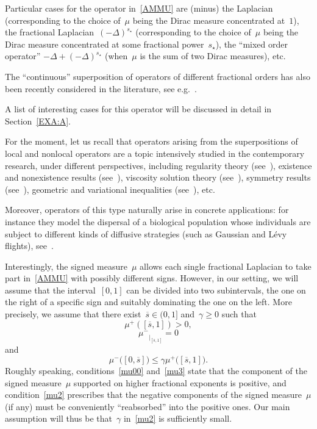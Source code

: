 \documentclass[12pt,a4paper,intlimits,sumlimits]{amsart}
\theoremstyle{definition}
\theoremstyle{plain}
\numberwithin{equation}{section}
\renewcommand{\le}{\leqslant}
\renewcommand{\ge}{\geqslant}
\begin{document}
Particular cases for the operator in~\eqref{AMMU} are (minus) the Laplacian (corresponding to the choice of~$\mu$ being the
Dirac measure concentrated at~$1$), the fractional Laplacian~$(-\Delta)^{s_\star}$
(corresponding to the choice of~$\mu$ being the
Dirac measure concentrated at some fractional power~$s_\star$),
the ``mixed order operator'' $-\Delta+(-\Delta)^{s_\star}$
(when~$\mu$ is the sum of two Dirac measures), etc.

The ``continuous'' superposition of operators of different fractional orders has also been recently considered in the literature, see e.g.~\cite{MR3485125}.

A list of interesting cases for this operator will be discussed in detail in Section~\ref{EXA:A}.

For the moment, let us recall that operators arising from the superpositions of local and nonlocal operators
are a topic intensively studied in the contemporary research, under different perspectives, including
regularity theory (see~\cite{MR2911421, MR4381148, MR4387204, MR4469224, MR4530314, MIN}),
existence and nonexistence results (see~\cite{MR4275496}),
viscosity solution theory (see~\cite{MR2129093, MR2653895}),
symmetry results (see~\cite{MR4313576}), geometric and variational inequalities (see~\cite{MR4391102, FABE}), etc.

Moreover, operators of this type naturally arise in concrete applications: for instance they model the dispersal of a biological population whose individuals are subject to different kinds of diffusive strategies (such as Gaussian and L\'evy flights), see~\cite{MR4249816, EDOARDO}.

Interestingly, the signed measure~$\mu$ allows each single fractional Laplacian to take part in~\eqref{AMMU} with possibly different signs. However, in our setting, we will assume that
the interval~$[{{ 0 }}, 1]$ can be divided into two subintervals, the one on the right of a specific sign
and suitably dominating the one on the left. More precisely,
we assume that there exist~$\overline s\in ({{ 0 }}, 1]$ and~$\gamma\ge0$ such that
\begin{equation}\label{mu00}
{\mu^+}([\overline s, 1])>0,
\end{equation}
\begin{equation}\label{mu3}
{\mu^-}_{\big|_{[\overline s, 1]}}=0
\end{equation}
and
\begin{equation}\label{mu2}
\mu^-\big([{{ 0 }}, \overline s]\big)\le\gamma
\mu^+\big([\overline s, 1]\big).
\end{equation}
Roughly speaking, conditions~\eqref{mu00} and~\eqref{mu3} state that the component of the signed measure~$\mu$ supported
on higher fractional exponents is positive, and condition~\eqref{mu2} prescribes that the
negative components of the signed measure~$\mu$ (if any) must be conveniently ``reabsorbed'' into the positive ones.
Our main assumption will thus be that~$\gamma$ in~\eqref{mu2} is sufficiently small.
\medskip
\end{document}
